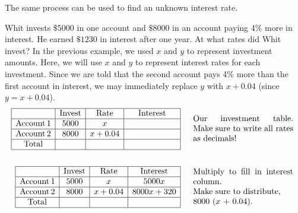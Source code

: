 The same process can be used to find an unknown interest rate.
\begin{example}
  Whit invests $\$5000$ in one account and $\$8000$ in an
  account paying 4\% more in interest. He earned $\$1230$ in interest
  after one year. At what rates did Whit invest?\pp
	In the previous example, we used $x$ and $y$ to represent investment amounts.  Here, we will use $x$ and $y$ to represent interest rates for each investment.  Since we are told that the second account pays 4\% more than the first account in interest, we may immediately replace $y$ with $x+0.04$ (since $y=x+0.04$).  
  \begin{eqnarray*}
    \begin{array}{|c|c|c|c|}
      \hline
      & \tmop{Invest} & \tmop{Rate} & \tmop{Interest}\\
      \hline
      \tmop{Account} 1 & 5000 & x & \\
      \hline
      \tmop{Account} 2 & 8000 & x + 0.04 & \\
      \hline
      \tmop{Total} &  &  & \mbox{\hspace{.8in}}\\
      \hline
    \end{array} &  & \begin{array}{p{0.35\textwidth}}
      \tmop{Our} \tmop{investment} \tmop{table}. \tmop{Make} \tmop{sure} \tmop{to} \tmop{write} \tmop{all} \tmop{rates}
      \tmop{as} \tmop{decimals}!
    \end{array}\\
    &  & \\
    \begin{array}{|c|c|c|c|}
      \hline
      & \tmop{Invest} & \tmop{Rate} & \tmop{Interest}\\
      \hline
      \tmop{Account} 1 & 5000 & x & 5000 x\\
      \hline
      \tmop{Account} 2 & 8000 & x + 0.04 & 8000 x + 320\\
      \hline
      \tmop{Total} &  &  & \\
      \hline
    \end{array} &  & \begin{array}{p{0.35\textwidth}}
      \tmop{Multiply} \tmop{to} \tmop{fill} \tmop{in} \tmop{interest}
      \tmop{column}.\\
      \tmop{Make} \tmop{sure} \tmop{to} \tmop{distribute},\\
			8000 ($x$ + 0.04).
    \end{array}\\

\end{eqnarray*}
\end{example}
